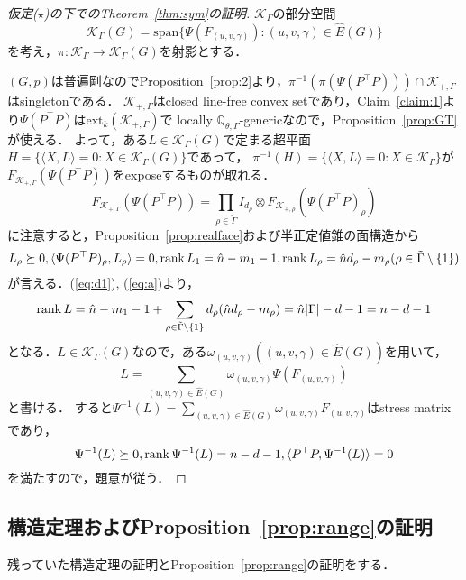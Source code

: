 \documentclass[11pt]{article}
\theoremstyle{definition}
\begin{document}
\begin{proof}[仮定($\star$)の下でのTheorem~\ref{thm:sym}の証明]
    $\mathcal{K}_\Gamma$の部分空間
    \[
        \mathcal{K}_\Gamma(G)=\text{span} \{\Psi(F_{(u,v,\gamma)}) : (u,v,\gamma) \in \hat{E}(G)\}
    \]
    を考え，$\pi:\mathcal{K}_\Gamma \rightarrow \mathcal{K}_\Gamma(G)$を射影とする．
    
    $(G,p)$は普遍剛なのでProposition~\ref{prop:2}より，$\pi^{-1}(\pi(\Psi(P^\top P))) \cap \mathcal{K}_{+,\Gamma}$はsingletonである．
    $\mathcal{K}_{+,\Gamma}$はclosed line-free convex setであり，Claim~\ref{claim:1}より$\Psi(P^\top P)$は$\text{ext}_k(\mathcal{K}_{+,\Gamma})$で
    locally $\mathbb{Q}_{\theta,\Gamma}$-genericなので，Proposition~\ref{prop:GT}が使える．
    よって，ある$L \in \mathcal{K}_\Gamma(G)$で定まる超平面$H=\{\langle X,L \rangle =0 : X \in \mathcal{K}_\Gamma(G) \}$であって，
    $\pi^{-1}(H)=\{\langle X,L \rangle =0 : X \in \mathcal{K}_\Gamma \}$が$F_{\mathcal{K}_{+,\Gamma}}(\Psi(P^\top P))$をexposeするものが取れる．
    \[
        F_{\mathcal{K}_{+,\Gamma}}(\Psi(P^\top P)) = \prod_{\rho \in \tilde{\Gamma}} I_{d_\rho} \otimes F_{\mathcal{K}_{+,\rho}} (\Psi(P^\top P)_\rho)
    \]
    に注意すると，Proposition~\ref{prop:realface}および半正定値錐の面構造から
    \[
        L_\rho \succeq 0, \langle \Psi(P^\top P)_\rho, L_\rho \rangle=0,
        \rank L_1= \hat{n}-m_1-1, \rank L_\rho = \hat{n}d_\rho-m_\rho (\rho \in \tilde{\Gamma} \setminus \{1\})
    \]
    が言える．(\ref{eq:d1}), (\ref{eq:a})より，
    \[
        \rank L = \hat{n}-m_1-1 + \sum_{\rho \in \tilde{\Gamma} \setminus \{1\}} d_\rho(\hat{n}d_\rho-m_\rho) = \hat{n}|\Gamma|-d-1=n-d-1
    \]
    となる．$L \in \mathcal{K}_\Gamma(G)$なので，ある$\omega_{(u,v,\gamma)} ((u,v,\gamma) \in \hat{E}(G))$を用いて，
    \[
        L=\sum_{(u,v,\gamma) \in \hat{E}(G)} \omega_{(u,v,\gamma)}\Psi(F_{(u,v,\gamma)})
    \]
    と書ける．
    すると$\Psi^{-1}(L)=\sum_{(u,v,\gamma)\in \hat{E}(G)} \omega_{(u,v,\gamma)}F_{(u,v,\gamma)}$はstress matrixであり，
    \[
        \Psi^{-1}(L) \succeq 0, \rank \Psi^{-1}(L)=n-d-1, \langle P^\top P, \Psi^{-1}(L) \rangle =0
    \]
    を満たすので，題意が従う．
    \end{proof}
    
\subsection{構造定理およびProposition~\ref{prop:range}の証明} \label{sec:4.5}
    残っていた構造定理の証明とProposition~\ref{prop:range}の証明をする．
    
\end{document}
